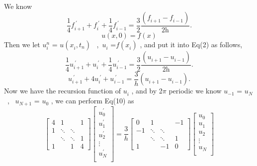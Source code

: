 \documentclass{report}
\begin{document}
We know
\begin{displaymath}
\frac{1}{4}\textit{f}^{\ \prime}_{i+1}+\textit{f}^{\ \prime}_{i}+\frac{1}{4}\textit{f}^{\ \prime}_{i-1} = \frac{3}{2}\frac{(\textit{f}^{}_{i+1}-\textit{f}^{}_{i-1})}{2\textit{h}}.
\end{displaymath}
\begin{displaymath}
u(x,0) = f(x)
\end{displaymath}
Then we let $u^{n}_{i}$ =   $u(x^{}_{i},t^{}_{n})$  \ ,\  $u^{}_{i}$ =$ f(x^{}_{i})$ , and put it into Eq(2) as follows,
\begin{displaymath}
 \frac{1}{4}\textit{u}^{\ \prime}_{i+1}+\textit{u}^{\ \prime}_{i}+\frac{1}{4}\textit{u}^{\ \prime}_{i-1} = \frac{3}{2}\frac{(\textit{u}^{}_{i+1}-\textit{u}^{}_{i-1})}{2\textit{h}}.
\end{displaymath}
\begin{equation}
 \textit{u}^{\ \prime}_{i+1}+4\textit{u}^{\ \prime}_{i}+\textit{u}^{\ \prime}_{i-1} = \frac{3}{h}(\textit{u}^{}_{i+1}-\textit{u}^{}_{i-1}).
\end{equation}
Now we have the recursion function of $u^{}_{i}$ , and by 2$\pi$ periodic we know $u^{}_{-1}$ = $u^{}_{N}$ \ , \ $u^{}_{N+1}$ = $u^{}_{0}$ , we can perform  Eq(10) as 
\begin{equation}
\left[ 
\begin{matrix}
4 & 1 & ~ & 1\\
1 & \ddots & \ddots & ~\\
~ & \ddots & \ddots & 1\\
1 & ~ & 1 & 4
\end{matrix}
\right] 
\left[ 
\begin{matrix}
u^{\prime}_{0}\\
u^{\prime}_{1}\\
u^{\prime}_{2}\\
\vdots\\
u^{\prime}_{N}\\
\end{matrix}
\right]
=
\frac{3}{h}
\left[
\begin{matrix}
0& 1 & ~ & -1\\
-1 & \ddots & \ddots & ~\\
~ & \ddots & \ddots & 1\\
1 & ~ & -1 & 0
\end{matrix}
\right]
\left[
\begin{matrix}
u^{}_{0}\\
u^{}_{1}\\
u^{}_{2}\\
\vdots\\
u^{}_{N}\\
\end{matrix}
\right]
\end{equation}
\end{document}
